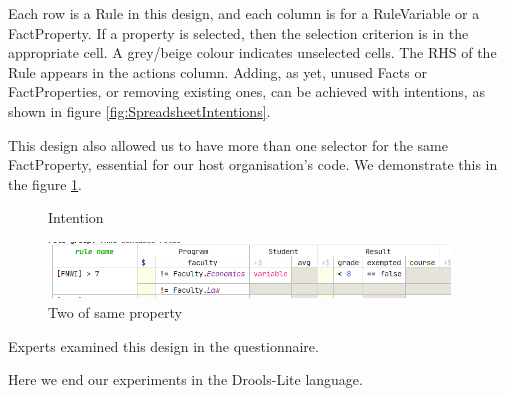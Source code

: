 Each row is a Rule in this design, and each column is for a RuleVariable or a FactProperty.
If a property is selected, then the selection criterion is in the appropriate cell.
A grey/beige colour indicates unselected cells.
The RHS of the Rule appears in the actions column.
Adding, as yet, unused Facts or FactProperties, or removing existing ones, can be achieved with intentions, as shown in figure \ref{fig:SpreadsheetIntentions}.

This design also allowed us to have more than one selector for the same FactProperty, essential for our host organisation's code.
We demonstrate this in the figure \ref{fig:TwoProperties}.

\begin{figure}
    \centering
    \begin{minipage}{0.35\textwidth}
        \centering
        \caption{Intention}
        \label{fig:SpreadsheetIntentions}
    \end{minipage}\hfill
    \begin{minipage}{0.65\textwidth}
        \centering
        \includegraphics[width=0.95\textwidth]{Sections/images/spreadsheetTwoProperties.png} 
        \caption{Two of same property}
        \label{fig:TwoProperties}
    \end{minipage}
\end{figure}

Experts examined this design in the questionnaire.

Here we end our experiments in the Drools-Lite language.

